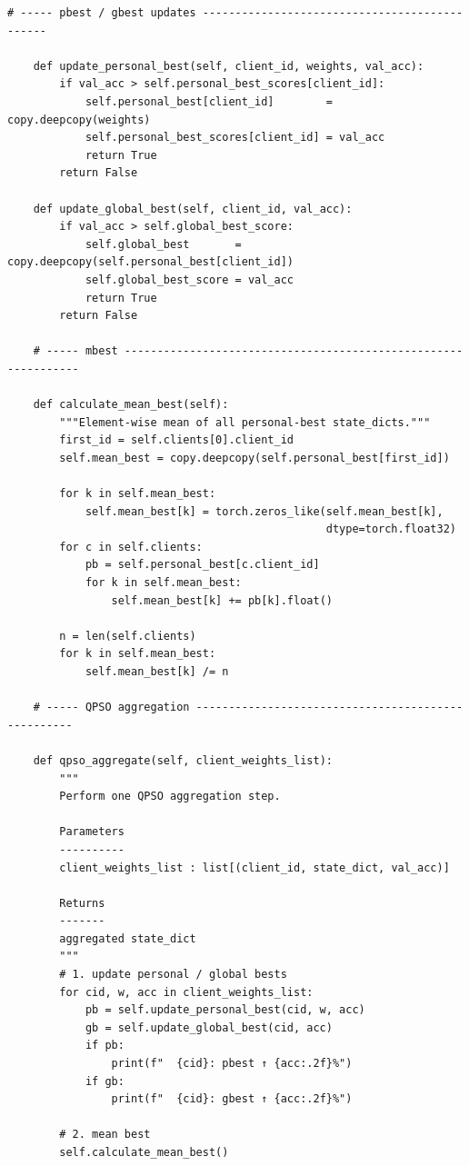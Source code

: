 \begin{lstlisting}[caption={QPSO Server Aggregation (server\_qpso.py)}, label={lst:qpso}]
    # ----- pbest / gbest updates ----------------------------------------------

    def update_personal_best(self, client_id, weights, val_acc):
        if val_acc > self.personal_best_scores[client_id]:
            self.personal_best[client_id]        = copy.deepcopy(weights)
            self.personal_best_scores[client_id] = val_acc
            return True
        return False

    def update_global_best(self, client_id, val_acc):
        if val_acc > self.global_best_score:
            self.global_best       = copy.deepcopy(self.personal_best[client_id])
            self.global_best_score = val_acc
            return True
        return False

    # ----- mbest ---------------------------------------------------------------

    def calculate_mean_best(self):
        """Element-wise mean of all personal-best state_dicts."""
        first_id = self.clients[0].client_id
        self.mean_best = copy.deepcopy(self.personal_best[first_id])

        for k in self.mean_best:
            self.mean_best[k] = torch.zeros_like(self.mean_best[k],
                                                 dtype=torch.float32)
        for c in self.clients:
            pb = self.personal_best[c.client_id]
            for k in self.mean_best:
                self.mean_best[k] += pb[k].float()

        n = len(self.clients)
        for k in self.mean_best:
            self.mean_best[k] /= n

    # ----- QPSO aggregation ---------------------------------------------------

    def qpso_aggregate(self, client_weights_list):
        """
        Perform one QPSO aggregation step.

        Parameters
        ----------
        client_weights_list : list[(client_id, state_dict, val_acc)]

        Returns
        -------
        aggregated state_dict
        """
        # 1. update personal / global bests
        for cid, w, acc in client_weights_list:
            pb = self.update_personal_best(cid, w, acc)
            gb = self.update_global_best(cid, acc)
            if pb:
                print(f"  {cid}: pbest ↑ {acc:.2f}%")
            if gb:
                print(f"  {cid}: gbest ↑ {acc:.2f}%")

        # 2. mean best
        self.calculate_mean_best()


\end{lstlisting}
